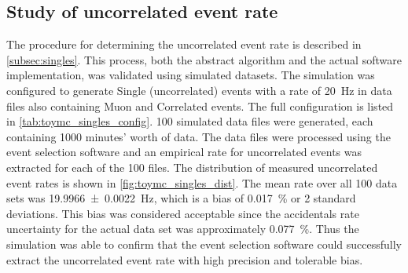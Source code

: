 \subsection{Study of uncorrelated event rate}
\label{subsec:sim_singles}

The procedure for determining the uncorrelated event rate
is described in \cref{subsec:singles}.
This process, both the abstract algorithm and the actual software implementation,
was validated using simulated datasets.
The simulation was configured to generate Single (uncorrelated) events
with a rate of \SI{20}{\Hz}
in data files also containing Muon and Correlated events.
The full configuration is listed in \cref{tab:toymc_singles_config}.
100 simulated data files were generated,
each containing 1000 minutes' worth of data.
The data files were processed using the event selection software
and an empirical rate for uncorrelated events was extracted
for each of the 100 files.
The distribution of measured uncorrelated event rates
is shown in \cref{fig:toymc_singles_dist}.
The mean rate over all 100 data sets
was \SI{19.9966+-0.0022}{\Hz},
which is a bias of \SI{0.017}{\percent} or 2 standard deviations.
This bias was considered acceptable
since the accidentals rate uncertainty
for the actual data set was approximately \SI{0.077}{\percent}.
Thus the simulation was able to confirm that
the event selection software could successfully extract
the uncorrelated event rate with high precision and tolerable bias.

